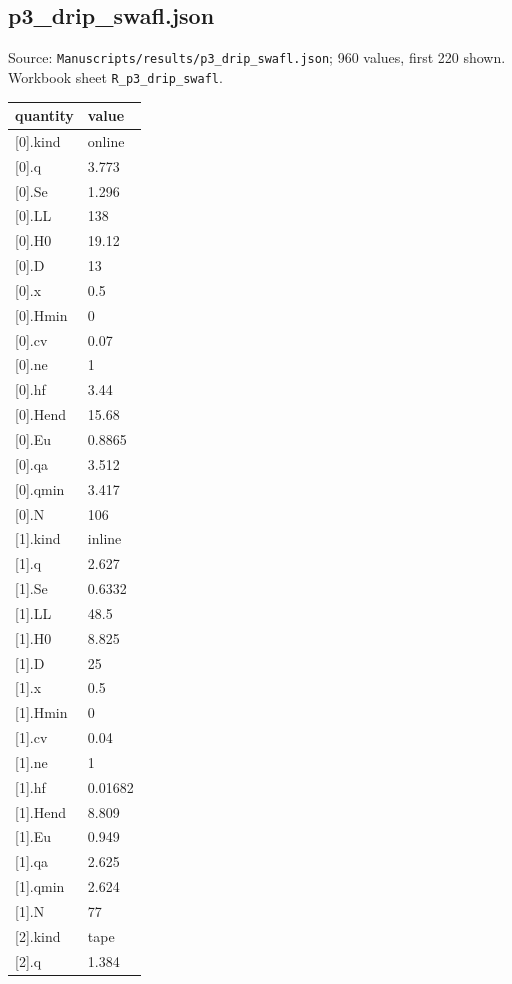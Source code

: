 \subsection*{p3\_drip\_swafl.json}
\noindent\small Source: \nolinkurl{Manuscripts/results/p3_drip_swafl.json}; 960 values, first 220 shown. Workbook sheet \texttt{R\_p3\_drip\_swafl}.\par
{\scriptsize\begin{longtable}{p{}p{}}\toprule\textbf{quantity} & \textbf{value}\\\midrule\endhead
{}[0].kind & online\\
{}[0].q & 3.773\\
{}[0].Se & 1.296\\
{}[0].LL & 138\\
{}[0].H0 & 19.12\\
{}[0].D & 13\\
{}[0].x & 0.5\\
{}[0].Hmin & 0\\
{}[0].cv & 0.07\\
{}[0].ne & 1\\
{}[0].hf & 3.44\\
{}[0].Hend & 15.68\\
{}[0].Eu & 0.8865\\
{}[0].qa & 3.512\\
{}[0].qmin & 3.417\\
{}[0].N & 106\\
{}[1].kind & inline\\
{}[1].q & 2.627\\
{}[1].Se & 0.6332\\
{}[1].LL & 48.5\\
{}[1].H0 & 8.825\\
{}[1].D & 25\\
{}[1].x & 0.5\\
{}[1].Hmin & 0\\
{}[1].cv & 0.04\\
{}[1].ne & 1\\
{}[1].hf & 0.01682\\
{}[1].Hend & 8.809\\
{}[1].Eu & 0.949\\
{}[1].qa & 2.625\\
{}[1].qmin & 2.624\\
{}[1].N & 77\\
{}[2].kind & tape\\
{}[2].q & 1.384\\

\end{longtable}}
